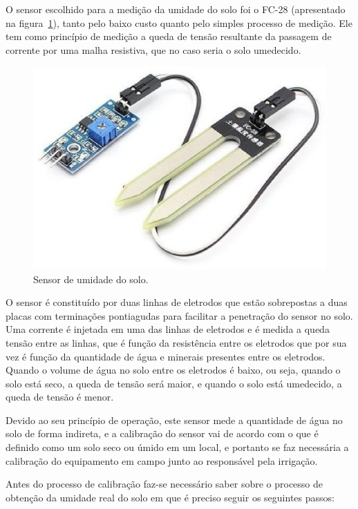 		O sensor escolhido para a medição da umidade do solo foi o FC-28 (apresentado
		na figura~\ref{fig:fc28}),
		tanto pelo baixo custo quanto pelo simples processo de medição.
		Ele tem como princípio de medição a queda de tensão resultante da
		passagem de corrente por uma malha resistiva, que no caso seria o solo
		umedecido.

		\begin{figure}[!htbp]
		\begin{center}
		\includegraphics[width=.5\textwidth]{figuras/higrometer.eps}
		\caption{\label{fig:fc28}Sensor de umidade do solo.}
		\end{center}
		\end{figure}

		O sensor é constituído por duas linhas de eletrodos que estão
		sobrepostas a duas placas com terminações pontiagudas para facilitar a
		penetração do sensor no solo. Uma corrente é injetada em uma das linhas
		de eletrodos e é medida a queda tensão entre as linhas, que é função da
		resistência entre os eletrodos que por sua vez é função da quantidade de
		água e minerais presentes entre os eletrodos. Quando o volume de água no
		solo entre os eletrodos é baixo, ou seja, quando o solo está seco,
		a queda de tensão será maior, e quando o solo está umedecido,
		a queda de tensão é menor.

		Devido ao seu princípio de operação, este sensor mede a quantidade de
		água no solo de forma indireta, e a calibração do sensor vai de acordo
		com o que é definido como um solo seco ou úmido em um local, e portanto
		se faz necessária a calibração do equipamento em campo junto ao
		responsável pela irrigação.

		Antes do processo de calibração faz-se necessário saber sobre o processo de obtenção
		da umidade real do solo em que é preciso seguir os seguintes passos:

